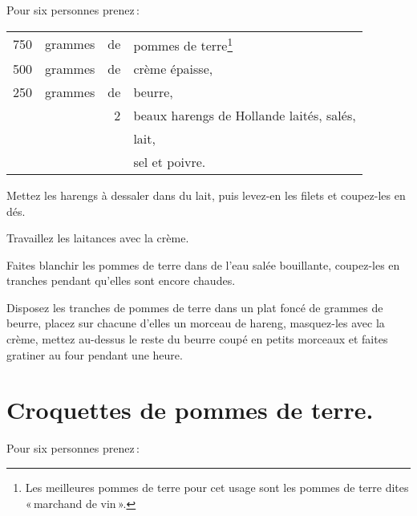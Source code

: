 Pour six personnes prenez :

\footnotesize
\begin{longtable}{rrrp{16em}}
    750 & grammes & de & pommes de terre\footnote{Les meilleures pommes de terre
                         pour cet usage sont les pommes de terre dites « marchand
                         de vin ». }                                                                      \\
    500 & grammes & de & crème épaisse,                                                                   \\
    250 & grammes & de & beurre,                                                                          \\
        &         &  2 & beaux harengs de Hollande laités, salés,                                         \\
        &         &    & lait,                                                                            \\
        &         &    & sel et poivre.                                                                   \\
\end{longtable}
\normalsize

Mettez les harengs à dessaler dans du lait, puis levez-en les filets et
coupez-les en dés.

Travaillez les laitances avec la crème.

Faites blanchir les pommes de terre dans de l'eau salée bouillante, coupez-les
en tranches pendant qu'elles sont encore chaudes.

Disposez les tranches de pommes de terre dans un plat foncé de {\mmm}
grammes de beurre, placez sur chacune d'elles un morceau de hareng, masquez-les
avec la crème, mettez au-dessus le reste du beurre coupé en petits morceaux et
faites gratiner au four pendant une heure.

\section*{\centering Croquettes de pommes de terre.}
{}

Pour six personnes prenez :

